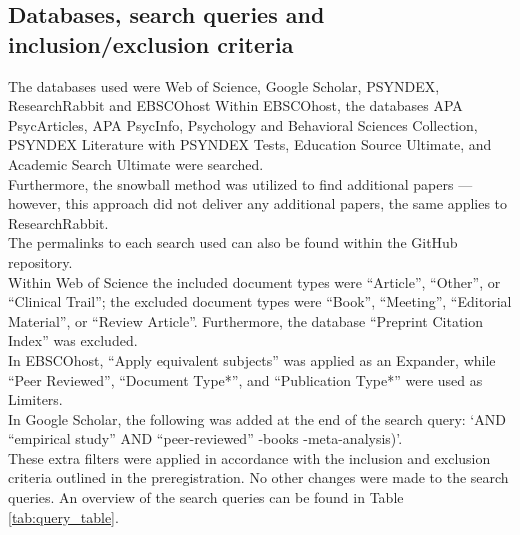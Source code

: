\documentclass[
  stu, a4paper, 12pt,mask,floatsintext]{apa7}
\begin{document}
\subsection{Databases, search queries and inclusion/exclusion criteria}\label{databases-search-queries-and-inclusionexclusion-criteria}

The databases used were Web of Science, Google Scholar, PSYNDEX, ResearchRabbit and EBSCOhost Within EBSCOhost, the databases APA PsycArticles, APA PsycInfo, Psychology and Behavioral Sciences Collection, PSYNDEX Literature with PSYNDEX Tests, Education Source Ultimate, and Academic Search Ultimate were searched.\\
Furthermore, the snowball method was utilized to find additional papers --- however, this approach did not deliver any additional papers, the same applies to ResearchRabbit.\\
The permalinks to each search used can also be found within the GitHub repository.\\
Within Web of Science the included document types were ``Article'', ``Other'', or ``Clinical Trail''; the excluded document types were ``Book'', ``Meeting'', ``Editorial Material'', or ``Review Article''.
Furthermore, the database ``Preprint Citation Index'' was excluded.\\
In EBSCOhost, ``Apply equivalent subjects'' was applied as an Expander, while ``Peer Reviewed'', ``Document Type*'', and ``Publication Type*'' were used as Limiters.\\
In Google Scholar, the following was added at the end of the search query: `AND ``empirical study'' AND ``peer-reviewed'' -books -meta-analysis)'.\\
These extra filters were applied in accordance with the inclusion and exclusion criteria outlined in the preregistration. No other changes were made to the search queries. An overview of the search queries can be found in Table \ref{tab:query_table}.
\end{document}

